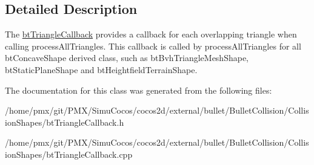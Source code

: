 \subsection{Detailed Description}
The \hyperlink{classbtTriangleCallback}{bt\+Triangle\+Callback} provides a callback for each overlapping triangle when calling process\+All\+Triangles. This callback is called by process\+All\+Triangles for all bt\+Concave\+Shape derived class, such as bt\+Bvh\+Triangle\+Mesh\+Shape, bt\+Static\+Plane\+Shape and bt\+Heightfield\+Terrain\+Shape. 

The documentation for this class was generated from the following files\+:\begin{DoxyCompactItemize}
\item 
/home/pmx/git/\+P\+M\+X/\+Simu\+Cocos/cocos2d/external/bullet/\+Bullet\+Collision/\+Collision\+Shapes/bt\+Triangle\+Callback.\+h\item 
/home/pmx/git/\+P\+M\+X/\+Simu\+Cocos/cocos2d/external/bullet/\+Bullet\+Collision/\+Collision\+Shapes/bt\+Triangle\+Callback.\+cpp\end{DoxyCompactItemize}
